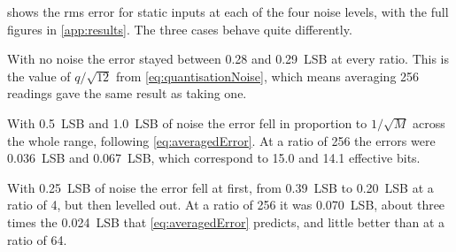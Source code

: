  shows the rms error for static inputs at each of the four
noise levels, with the full figures in \cref{app:results}. The three
cases behave quite differently.



With no noise the error stayed between 0.28 and \qty{0.29}{LSB} at every
ratio. This is the value of $q/\sqrt{12}$ from \cref{eq:quantisationNoise},
which means averaging 256 readings gave the same result as taking one.

With \qty{0.5}{LSB} and \qty{1.0}{LSB} of noise the error fell in proportion
to $1/\sqrt{M}$ across the whole range, following \cref{eq:averagedError}. At
a ratio of 256 the errors were \qty{0.036}{LSB} and \qty{0.067}{LSB}, which
correspond to 15.0 and 14.1 effective bits.

With \qty{0.25}{LSB} of noise the error fell at first, from
\qty{0.39}{LSB} to \qty{0.20}{LSB} at a ratio of 4, but then levelled out. At
a ratio of 256 it was \qty{0.070}{LSB}, about three times the
\qty{0.024}{LSB} that \cref{eq:averagedError} predicts, and little better
than at a ratio of 64.

